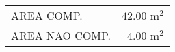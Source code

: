 \documentclass[10pt]{article}
\begin{document}
\begin{tabular}{l r}
\hline
AREA COMP. & $42.00$ m$^2$ \\
AREA NAO COMP. & $4.00$ m$^2$ \\
\hline
\end{tabular}
\end{document}
